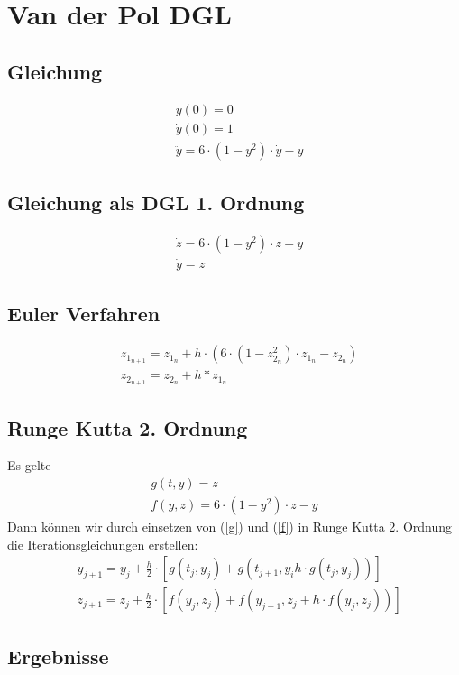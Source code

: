\documentclass[10pt]{scrartcl}
\begin{document}
\section{Van der Pol DGL}
	\subsection{Gleichung}
		\begin{align}
		&y(0) = 0\\
		&\dot{y}(0) = 1\\
		&\ddot{y} = 6 \cdot (1-y^2) \cdot \dot{y} -y
		\end{align}
	\subsection{Gleichung als DGL 1. Ordnung}
		\begin{align}
			&\dot{z} = 6 \cdot (1-y^2) \cdot z - y\\
			&\dot{y} = z
		\end{align}
		
	\subsection{Euler Verfahren}
	\begin{align}
		&z_{1_{n+1}} = z_{1_{n}} + h \cdot (6 \cdot (1-z_{2_{n}}^2) \cdot z_{1_{n}} - z_{2_{n}})\\
		&z_{2_{n+1}} = z_{2_n} + h * z_{1_n}
	\end{align}
	
	
	\subsection{Runge Kutta 2. Ordnung}
	Es gelte	
	\begin{align}
		g(t,y) = z \label{g}\\		
		f(y,z) = 6 \cdot (1-y^2) \cdot z - y \label{f}
	\end{align}
	Dann können wir durch einsetzen von (\ref{g}) und (\ref{f}) in Runge Kutta 2. Ordnung die Iterationsgleichungen erstellen:
	\begin{align}
		&y_{j+1}=y_j + \frac{h}{2} \cdot [g(t_j, y_j) + g(t_{j+1}, y_i h \cdot g(t_j, y_j))]\\
		&z_{j+1}=z_j + \frac{h}{2} \cdot [f(y_j, z_j) + f(y_{j+1}, z_j + h \cdot f(y_j, z_j))]
	\end{align} 
	
	\subsection{Ergebnisse}
	
\end{document}
